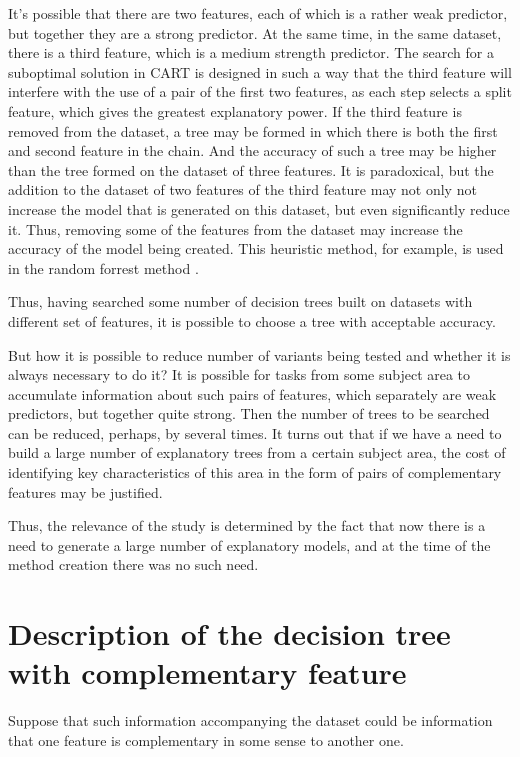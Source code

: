 \documentclass[conference]{IEEEtran}
\begin{document}
It's possible that there are two features, each of which is a rather weak predictor, but together they are a strong predictor. At the same time, in the same dataset, there is a third feature, which is a medium strength predictor. The search for a suboptimal solution in CART is designed in such a way that the third feature will interfere with the use of a pair of the first two features, as each step selects a split feature, which gives the greatest explanatory power. If the third feature is removed from the dataset, a tree may be formed in which there is both the first and second feature in the chain. And the accuracy of such a tree may be higher than the tree formed on the dataset of three features. It is paradoxical, but the addition to the dataset of two features of the third feature may not only not increase the model that is generated on this dataset, but even significantly reduce it. Thus, removing some of the features from the dataset may increase the accuracy of the model being created. This heuristic method, for example, is used in the random forrest method \cite{RF}.


Thus, having searched some number of decision trees built on datasets with different set of features, it is possible to choose a tree with acceptable accuracy.


But how it is possible to reduce number of variants being tested and whether it is always necessary to do it? It is possible for tasks from some subject area to accumulate information about such pairs of features, which separately are weak predictors, but together quite strong. Then the number of trees to be searched can be reduced, perhaps, by several times. It turns out that if we have a need to build a large number of explanatory trees from a certain subject area, the cost of identifying key characteristics of this area in the form of pairs of complementary features may be justified.


Thus, the relevance of the study is determined by the fact that now there is a need to generate a large number of explanatory models, and at the time of the method creation there was no such need.

\section{Description of the decision tree with complementary feature}

Suppose that such information accompanying the dataset could be information that one feature is complementary in some sense to another one. 
\end{document}
